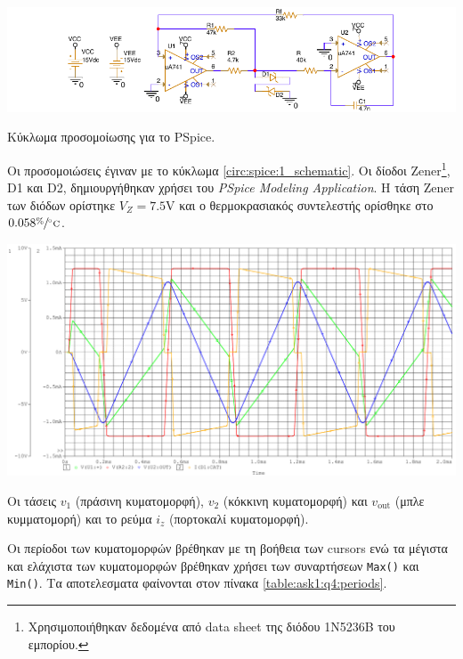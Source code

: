 \begin{center}
	\begin{circuitfig}[H]
		\includegraphics[width=15cm]{spice_01/schematic.pdf}
		\caption{Κύκλωμα προσομοίωσης για το PSpice.}
		\label{circ:spice:1_schematic}
	\end{circuitfig}
\end{center}
\vspace*{-10pt}

Οι προσομοιώσεις έγιναν με το κύκλωμα \ref{circ:spice:1_schematic}. Οι δίοδοι Zener\footnote{Χρησιμοποιήθηκαν δεδομένα από data sheet της διόδου 1N5236B του εμπορίου.}, D1 και D2, δημιουργήθηκαν χρήσει του \textsl{PSpice Modeling Application}. Η τάση Zener των διόδων ορίστηκε $V_Z=7.5\unit{\volt}$ και ο θερμοκρασιακός συντελεστής ορίσθηκε στο $0.058\displaystyle{\sfrac{\%}{\unit{\celsius}}}$.

\begin{plot_fig}[H]
	\begin{center}
		\includegraphics[width=15cm]{spice_01/q4.pdf}
		\caption{Οι τάσεις $v_1$ (πράσινη κυματομορφή), $v_2$ (κόκκινη κυματομορφή) και $v_{\mathrm{out}}$ (μπλε κυμματομορή) και το ρεύμα $i_z$ (πορτοκαλί κυματομορφή).}
		\label{plot:ask1:q4}
	\end{center}
\end{plot_fig}

Οι περίοδοι των κυματομορφών βρέθηκαν με τη βοήθεια των cursors ενώ τα μέγιστα και ελάχιστα των κυματομορφών βρέθηκαν χρήσει των συναρτήσεων \texttt{Max()} και \texttt{Min()}. Τα αποτελεσματα φαίνονται στον πίνακα \ref{table:ask1:q4:periods}.

